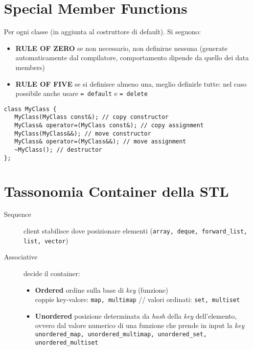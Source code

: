 \documentclass[10pt, oneside]{Book}
\begin{document}
\section{Special Member Functions}
Per ogni classe (in aggiunta al costruttore di default). Si seguono:
\begin{itemize}
\item \textbf{RULE OF ZERO} se non necessario, non definirne nessuna (generate automaticamente dal compilatore, comportamento dipende da quello dei data members)
\item \textbf{RULE OF FIVE} se si definisce almeno una, meglio definirle tutte: nel caso possibile anche usare \texttt{= default} e \texttt{= delete}
\end{itemize}
\begin{verbatim}
class MyClass {
   MyClass(MyClass const&); // copy constructor
   MyClass& operator=(MyClass const&); // copy assignment
   MyClass(MyClass&&); // move constructor
   MyClass& operator=(MyClass&&); // move assignment
   ~MyClass(); // destructor
};
\end{verbatim}

\section{Tassonomia Container della STL}
\begin{description}
\item[Sequence] client stabilisce dove posizionare elementi (\texttt{array, deque, forward\_list, list, vector})
\item[Associative] decide il container:
\begin{itemize}
\item \textbf{Ordered} ordine sulla base di \textit{key} (funzione)
\\coppie key-valore: \texttt{map, multimap} // valori ordinati: \texttt{set, multiset}
\item \textbf{Unordered} posizione determinata da \textit{hash} della \textit{key} dell'elemento, ovvero dal valore numerico di una funzione che prende in input la \textit{key}
\\\texttt{unordered\_map, unordered\_multimap, unordered\_set, unordered\_multiset}
\end{itemize}
\end{description}
\end{document}
